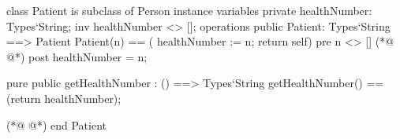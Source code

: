 \begin{vdmpp}[breaklines=true]
class Patient is subclass of Person
instance variables
  private healthNumber: Types`String;
  inv healthNumber <> [];
operations
 public Patient: Types`String ==> Patient
  Patient(n) == ( healthNumber := n; return self)
 pre n <> []
(*@
\label{Patient:9}
@*)
 post healthNumber = n;
 
 pure public getHealthNumber : () ==> Types`String
  getHealthNumber() == (return healthNumber);

(*@
\label{getHealthNumber:14}
@*)
end Patient
\end{vdmpp}
